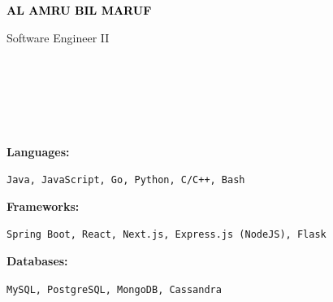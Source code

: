 \documentclass[9pt]{developercv}
\begin{document}
\begin{minipage}[t]{0.45\textwidth} 
	\vspace{-\baselineskip} 
	
	{ \fontsize{16}{20} \textcolor{black}{\textbf{\MakeUppercase{Al Amru Bil Maruf}}}}
	
	\vspace{6pt}
	
	{\Large Software Engineer II} 
\end{minipage}
\hfill
\begin{minipage}[t]{0.2\textwidth} 
	\vspace{-\baselineskip} 
	
     \\
     \\
	
\end{minipage}
\begin{minipage}[t]{0.3\textwidth} 
	\vspace{-\baselineskip}
	
	 \\	
     \\  
    
\end{minipage}

\vspace{-6pt}

\begin{minipage}[t]{0.2\textwidth}
    \textbf{Languages:}
\end{minipage}
\hfill
\begin{minipage}[t]{0.8\textwidth}
  {\large \texttt{Java, JavaScript, Go, Python, C/C++, Bash}}
\end{minipage}

\begin{minipage}[t]{0.2\textwidth}
    \textbf{Frameworks:}
\end{minipage}
\hfill
\begin{minipage}[t]{0.8\textwidth}
  {\large \texttt{Spring Boot, React, Next.js, Express.js (NodeJS), Flask}}
\end{minipage}

\begin{minipage}[t]{0.2\textwidth}
    \textbf{Databases:}
\end{minipage}
\hfill
\begin{minipage}[t]{0.8\textwidth}
  {\large \texttt{MySQL, PostgreSQL, MongoDB, Cassandra}}
\end{minipage}
\end{document}
